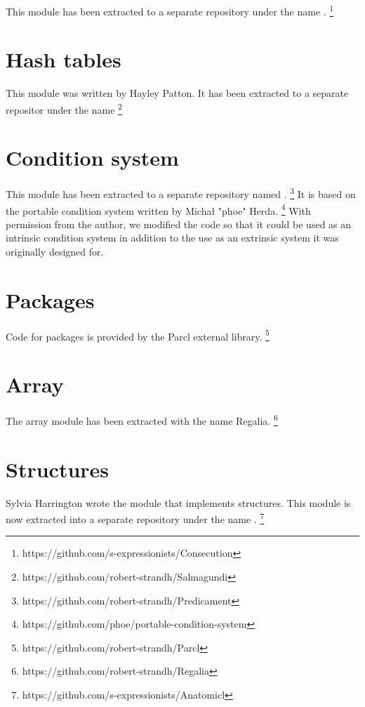 This module has been extracted to a separate repository under the name
\consecution{}.%
\footnote{https://github.com/s-expressionists/Consecution}

\section{Hash tables}
\label{sec-hash-tables}

This module was written by Hayley Patton.  It has been extracted to a
separate repositor under the name \salmagundi{}%
\footnote{https://github.com/robert-strandh/Salmagundi}

\section{Condition system}
\label{sec-condition-system}

This module has been extracted to a separate repository named
\predicament{}.%
\footnote{https://github.com/robert-strandh/Predicament}
It is based on the portable condition system written by Michał "phoe"
Herda.%
\footnote{https://github.com/phoe/portable-condition-system}
With permission from the author, we modified the code so that it could
be used as an intrinsic condition system in addition to the use as an
extrinsic system it was originally designed for.

\section{Packages}
\label{sec-packages}

Code for packages is provided by the Parcl external library.%
\footnote{https://github.com/robert-strandh/Parcl}

\section{Array}
\label{sec-array}

The array module has been extracted with the name Regalia.%
\footnote{https://github.com/robert-strandh/Regalia}

\section{Structures}
\label{sec-structures}

Sylvia Harrington wrote the \sysname{} module that implements
structures.  This module is now extracted into a separate repository
under the name \anatomicl{}.%
\footnote{https://github.com/s-expressionists/Anatomicl}


